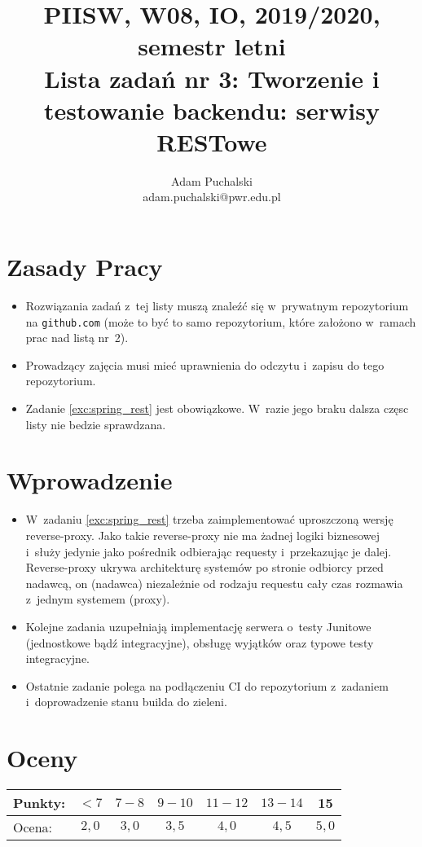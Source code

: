 \documentclass[12pt]{article}
\title{PIISW, W08, IO, 2019/2020, semestr letni\\Lista zadań nr 3: Tworzenie i testowanie backendu: serwisy RESTowe}
\author{Adam Puchalski\\ \small adam.puchalski@pwr.edu.pl}
\begin{document}
    \maketitle

    \section*{Zasady Pracy}
    \begin{itemize}
        \item Rozwiązania zadań z~tej listy muszą znaleźć się w~prywatnym repozytorium na \texttt{github.com} (może to być to samo repozytorium, które założono w~ramach prac nad listą nr~2).
        \item Prowadzący zajęcia musi mieć uprawnienia do odczytu i~zapisu do tego repozytorium.
        \item Zadanie \ref{exc:spring_rest} jest obowiązkowe. W~razie jego braku dalsza częsc listy nie bedzie sprawdzana.
    \end{itemize}

\section*{Wprowadzenie}
\begin{itemize}
        \item  W~zadaniu \ref{exc:spring_rest} trzeba zaimplementować uproszczoną wersję reverse-proxy. Jako takie reverse-proxy nie ma żadnej logiki biznesowej i~służy jedynie jako pośrednik odbierając requesty i~przekazując je dalej. Reverse-proxy ukrywa architekturę systemów po stronie odbiorcy przed nadawcą, on (nadawca) niezależnie od rodzaju requestu cały czas rozmawia z~jednym systemem (proxy).
        \item Kolejne zadania uzupełniają implementację serwera o~testy Junitowe (jednostkowe bądź integracyjne), obsługę wyjątków oraz typowe testy integracyjne.
        \item Ostatnie zadanie polega na podłączeniu CI do repozytorium z~zadaniem i~doprowadzenie stanu builda do zieleni.
\end{itemize}

    \section*{Oceny}
    \begin{tabular}{|l|c|c|c|c|c|c|}
        \hline
        Punkty: & $<7$ & $7-8$ & $9-10$ & $11-12$ & $13-14$ & 15\\
        \hline
        Ocena:  & $2,0$ & $3,0$ & $3,5$ & $4,0$ & $4,5$ & $5,0$\\
        \hline
    \end{tabular}
\end{document}
